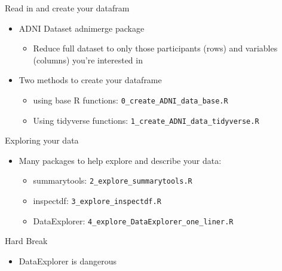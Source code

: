 \documentclass[
  ignorenonframetext,
]{beamer}
\providecommand{\tightlist}{%
  \setlength{\itemsep}{0pt}\setlength{\parskip}{0pt}}
\begin{document}
\begin{frame}[fragile]{Read in and create your datafram}
\protect\hypertarget{read-in-and-create-your-datafram}{}

\begin{itemize}
\tightlist
\item
  ADNI Dataset adnimerge package

  \begin{itemize}
  \tightlist
  \item
    Reduce full dataset to only those participants (rows) and variables
    (columns) you're interested in
  \end{itemize}
\item
  Two methods to create your dataframe

  \begin{itemize}
  \tightlist
  \item
    using base R functions: \texttt{0\_create\_ADNI\_data\_base.R}
  \item
    Using tidyverse functions:
    \texttt{1\_create\_ADNI\_data\_tidyverse.R}
  \end{itemize}
\end{itemize}

\end{frame}

\begin{frame}[fragile]{Exploring your data}
\protect\hypertarget{exploring-your-data}{}

\begin{itemize}
\tightlist
\item
  Many packages to help explore and describe your data:

  \begin{itemize}
  \tightlist
  \item
    summarytools: \texttt{2\_explore\_summarytools.R}
  \item
    inspectdf: \texttt{3\_explore\_inspectdf.R}
  \item
    DataExplorer: \texttt{4\_explore\_DataExplorer\_one\_liner.R}
  \end{itemize}
\end{itemize}

\end{frame}

\begin{frame}{Hard Break}
\protect\hypertarget{hard-break}{}

\begin{itemize}
\tightlist
\item
  DataExplorer is dangerous
\end{itemize}

\end{frame}
\end{document}
